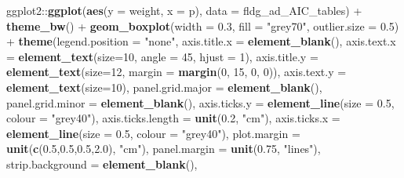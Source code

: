 \documentclass[]{article}
\newenvironment{Shaded}{\begin{snugshade}}{\end{snugshade}}
\newcommand{\KeywordTok}[1]{\textcolor[rgb]{0.13,0.29,0.53}{\textbf{{#1}}}}
\newcommand{\DataTypeTok}[1]{\textcolor[rgb]{0.13,0.29,0.53}{{#1}}}
\newcommand{\DecValTok}[1]{\textcolor[rgb]{0.00,0.00,0.81}{{#1}}}
\newcommand{\FloatTok}[1]{\textcolor[rgb]{0.00,0.00,0.81}{{#1}}}
\newcommand{\StringTok}[1]{\textcolor[rgb]{0.31,0.60,0.02}{{#1}}}
\newcommand{\NormalTok}[1]{{#1}}
\begin{document}
\begin{Shaded}
\begin{Highlighting}[]
\NormalTok{ggplot2::}\KeywordTok{ggplot}\NormalTok{(}\KeywordTok{aes}\NormalTok{(}\DataTypeTok{y =} \NormalTok{weight, }\DataTypeTok{x =} \NormalTok{p), }\DataTypeTok{data =} \NormalTok{fldg_ad_AIC_tables) +}\StringTok{ }
\StringTok{          }\KeywordTok{theme_bw}\NormalTok{() +}
\StringTok{          }\KeywordTok{geom_boxplot}\NormalTok{(}\DataTypeTok{width =} \FloatTok{0.3}\NormalTok{, }\DataTypeTok{fill =} \StringTok{"grey70"}\NormalTok{, }\DataTypeTok{outlier.size =} \FloatTok{0.5}\NormalTok{) +}
\StringTok{          }\KeywordTok{theme}\NormalTok{(}\DataTypeTok{legend.position =} \StringTok{"none"}\NormalTok{,}
                \DataTypeTok{axis.title.x =} \KeywordTok{element_blank}\NormalTok{(),}
                \DataTypeTok{axis.text.x  =} \KeywordTok{element_text}\NormalTok{(}\DataTypeTok{size=}\DecValTok{10}\NormalTok{, }\DataTypeTok{angle =} \DecValTok{45}\NormalTok{, }\DataTypeTok{hjust =} \DecValTok{1}\NormalTok{), }
                \DataTypeTok{axis.title.y =} \KeywordTok{element_text}\NormalTok{(}\DataTypeTok{size=}\DecValTok{12}\NormalTok{, }\DataTypeTok{margin =} \KeywordTok{margin}\NormalTok{(}\DecValTok{0}\NormalTok{, }\DecValTok{15}\NormalTok{, }\DecValTok{0}\NormalTok{, }\DecValTok{0}\NormalTok{)),}
                \DataTypeTok{axis.text.y  =} \KeywordTok{element_text}\NormalTok{(}\DataTypeTok{size=}\DecValTok{10}\NormalTok{),}
                \DataTypeTok{panel.grid.major =} \KeywordTok{element_blank}\NormalTok{(),}
                \DataTypeTok{panel.grid.minor =} \KeywordTok{element_blank}\NormalTok{(),}
                \DataTypeTok{axis.ticks.y =} \KeywordTok{element_line}\NormalTok{(}\DataTypeTok{size =} \FloatTok{0.5}\NormalTok{, }\DataTypeTok{colour =} \StringTok{"grey40"}\NormalTok{),}
                \DataTypeTok{axis.ticks.length =} \KeywordTok{unit}\NormalTok{(}\FloatTok{0.2}\NormalTok{, }\StringTok{"cm"}\NormalTok{),}
                \DataTypeTok{axis.ticks.x =} \KeywordTok{element_line}\NormalTok{(}\DataTypeTok{size =} \FloatTok{0.5}\NormalTok{, }\DataTypeTok{colour =} \StringTok{"grey40"}\NormalTok{),}
                \DataTypeTok{plot.margin =} \KeywordTok{unit}\NormalTok{(}\KeywordTok{c}\NormalTok{(}\FloatTok{0.5}\NormalTok{,}\FloatTok{0.5}\NormalTok{,}\FloatTok{0.5}\NormalTok{,}\FloatTok{2.0}\NormalTok{), }\StringTok{"cm"}\NormalTok{),}
                \DataTypeTok{panel.margin =} \KeywordTok{unit}\NormalTok{(}\FloatTok{0.75}\NormalTok{, }\StringTok{"lines"}\NormalTok{),}
                \DataTypeTok{strip.background =} \KeywordTok{element_blank}\NormalTok{(), }

\end{Highlighting}
\end{Shaded}
\end{document}
